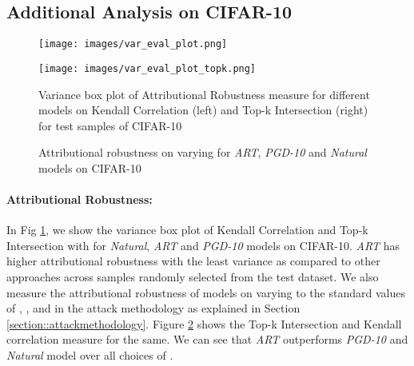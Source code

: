 \documentclass[runningheads]{llncs}
\begin{document}
\subsection{Additional Analysis on CIFAR-10}\label{sec::additional_attr}

\begin{figure}[t]
\centering
    \begin{minipage}{.45\textwidth}
      \texttt{[image: images/var\_eval\_plot.png]}
    \end{minipage}
    \begin{minipage}{.45\textwidth}
      \texttt{[image: images/var\_eval\_plot\_topk.png]}
    \end{minipage}
\caption{\footnotesize{Variance box plot of Attributional Robustness measure for different models on Kendall Correlation (left) and Top-k Intersection (right) for  test samples of CIFAR-10}}
\label{fig:var_plot_eval}
\end{figure}

\begin{figure}[t]
\centering
{}
\caption{\footnotesize{Attributional robustness on varying  for \textit{ART}, \textit{PGD-10} and \textit{Natural} models on CIFAR-10}}
\label{fig:art_acc_eps}
\end{figure}












\paragraph{Attributional Robustness:}\label{additional_attr}
In Fig \ref{fig:var_plot_eval}, we show the variance box plot of Kendall Correlation and Top-k Intersection with  for \textit{Natural}, \textit{ART} and \textit{PGD-10} \cite{madrypgd} models on CIFAR-10. \textit{ART} has higher attributional robustness with the least variance as compared to other approaches across  samples randomly selected from the test dataset. We also measure the attributional robustness of models on varying  to the standard values of , ,  and  in the attack methodology as explained in Section \ref{section::attackmethodology}. Figure \ref{fig:art_acc_eps} shows the Top-k Intersection and Kendall correlation measure for the same. We can see that \textit{ART} outperforms \textit{PGD-10} and \textit{Natural} model over all choices of . 
\end{document}
